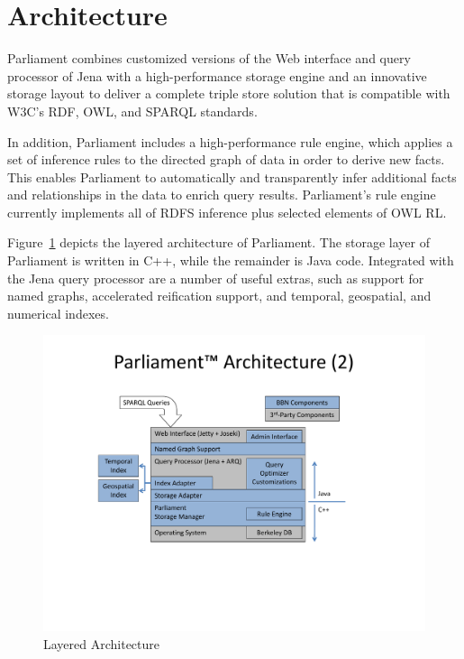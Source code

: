 \section{\protect\pmnt{} Architecture}

Parliament combines customized versions of the Web interface and query processor of Jena with a high-performance storage engine and an innovative storage layout to deliver a complete triple store solution that is compatible with W3C's RDF, OWL, and SPARQL standards.

In addition, Parliament includes a high-performance rule engine, which applies a set of inference rules to the directed graph of data in order to derive new facts.  This enables Parliament to automatically and transparently infer additional facts and relationships in the data to enrich query results.  Parliament's rule engine currently implements all of RDFS inference plus selected elements of OWL RL.

Figure~\ref{figure-parliament-layers} depicts the layered architecture of Parliament.  The storage layer of Parliament is written in C++, while the remainder is Java code.  Integrated with the Jena query processor are a number of useful extras, such as support for named graphs, accelerated reification support, and temporal, geospatial, and numerical indexes.

\begin{figure}[htbp]
	\centering
	\includegraphics[width=1.0\textwidth]{architecture.pdf}
	\caption{Layered \protect\pmnt{} Architecture}
	\label{figure-parliament-layers}
\end{figure}
